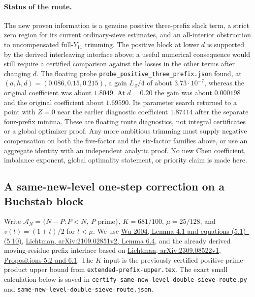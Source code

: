 \documentclass[11pt]{article}
\begin{document}
\paragraph{Status of the route.}
The new proven information is a genuine positive three-prefix slack
term, a strict zero region for its current ordinary-sieve estimates,
and an all-interior obstruction to uncompensated full-$Y_{11}$ trimming.
The positive block at lower $d$ is supported by the derived
interleaving interface above; a useful numerical consequence would
still require a certified comparison against the losses in the other
terms after changing $d$.  The floating probe
\texttt{probe\_positive\_three\_prefix.json} found, at
$(a,h,d)=(0.086,0.15,0.215)$, a gain $L_Z/4$ of about
$3.73\cdot10^{-7}$, whereas the original coefficient was about
$1.8049$.  At $d=0.20$ the gain was about $0.000198$ and the original
coefficient about $1.69590$.  Its parameter search returned to a
point with $Z=0$ near the earlier diagnostic coefficient $1.87414$
after the separate four-prefix minima.  These are floating route
diagnostics, not integral certificates or a global optimizer proof.
Any more ambitious trimming
must supply negative compensation on both the five-factor and the
six-factor families above, or use an aggregate identity with an
independent analytic proof.  No new Chen coefficient, imbalance
exponent, global optimality statement, or priority claim is made here.


\subsection{A same-new-level one-step correction on a Buchstab block}
\label{sec:same-new-level-double-sieve-route}

Write $\mathcal A_N=\{N-P:P<N,\ P\text{ prime}\}$,
$K=681/100$, $\mu=25/128$, and $v(t)=(1+t)/2$ for $t<\mu$.
We use
\href{https://www.impan.pl/shop/en/publication/transaction/download/product/82961}
{Wu 2004, Lemma 4.1 and equations (5.1)--(5.10)},
\href{https://arxiv.org/html/2109.02851v2}
{Lichtman, arXiv:2109.02851v2, Lemma 6.4},
and the already derived moving-residue prefix interface based on
\href{https://arxiv.org/html/2309.08522v1}
{Lichtman, arXiv:2309.08522v1, Propositions 5.2 and 6.1}.
The $K$ input is the previously certified positive prime-product upper
bound from \texttt{extended-prefix-upper.tex}. The exact small
calculation below is saved in
\texttt{certify-same-new-level-double-sieve-route.py} and
\texttt{same-new-level-double-sieve-route.json}.
\end{document}
